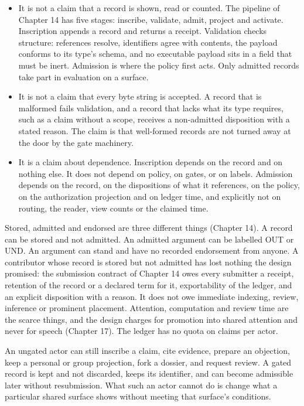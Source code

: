 \documentclass[11pt]{article}
\newcommand{\UND}{\textsf{UND}}
\newcommand{\OUT}{\textsf{OUT}}
\begin{document}
\begin{itemize}[nosep]
\item It is not a claim that a record is shown, read or counted. The pipeline of Chapter 14 has five stages: inscribe, validate, admit, project and activate. Inscription appends a record and returns a receipt. Validation checks structure: references resolve, identifiers agree with contents, the payload conforms to its type's schema, and no executable payload sits in a field that must be inert. Admission is where the policy first acts. Only admitted records take part in evaluation on a surface.
\item It is not a claim that every byte string is accepted. A record that is malformed fails validation, and a record that lacks what its type requires, such as a claim without a scope, receives a non-admitted disposition with a stated reason. The claim is that well-formed records are not turned away at the door by the gate machinery.
\item It is a claim about dependence. Inscription depends on the record and on nothing else. It does not depend on policy, on gates, or on labels. Admission depends on the record, on the dispositions of what it references, on the policy, on the authorization projection and on ledger time, and explicitly not on routing, the reader, view counts or the claimed time.
\end{itemize}

Stored, admitted and endorsed are three different things (Chapter 14). A record can be stored and not admitted. An admitted argument can be labelled \OUT{} or \UND{}. An argument can stand and have no recorded endorsement from anyone. A contributor whose record is stored but not admitted has lost nothing the design promised: the submission contract of Chapter 14 owes every submitter a receipt, retention of the record or a declared term for it, exportability of the ledger, and an explicit disposition with a reason. It does not owe immediate indexing, review, inference or prominent placement. Attention, computation and review time are the scarce things, and the design charges for promotion into shared attention and never for speech (Chapter 17). The ledger has no quota on claims per actor.

An ungated actor can still inscribe a claim, cite evidence, prepare an objection, keep a personal or group projection, fork a dossier, and request review. A gated record is kept and not discarded, keeps its identifier, and can become admissible later without resubmission. What such an actor cannot do is change what a particular shared surface shows without meeting that surface's conditions.
\end{document}
